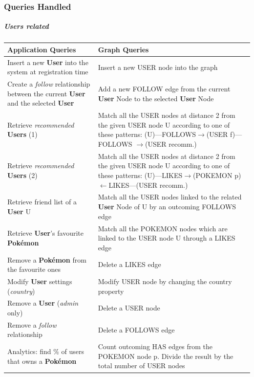 \subsubsection{Queries Handled}
\subparagraph{Users related}
\begingroup
\setlength{\tabcolsep}{10pt} %
\renewcommand{\arraystretch}{1.5} %
\begin{center}
	\begin{longtable}{|m{}| m{} |} 
		\hline
		\textbf{Application Queries} & \textbf{Graph Queries} \\ [0.5ex] 
		\hline
		Insert a new \textbf{User} into the system at registration time 		
		& Insert a new USER node into the graph\\ 
		\hline
		Create a \textit{follow} relationship between the current \textbf{User} and the selected \textbf{User}		
		& Add a new FOLLOW edge from the current \textbf{User} Node to the selected \textbf{User} Node \\ 
		\hline
		Retrieve \textit{recommended} \textbf{Users} (1)
		& Match all the USER nodes at distance 2 from the given USER node U according to one of these patterns:
		(U)—FOLLOWS$\rightarrow$(USER f)—FOLLOWS $\rightarrow$(USER recomm.)\\
		\hline
		Retrieve \textit{recommended} \textbf{Users} (2)
		& Match all the USER nodes at distance 2 from the given USER node U according to one of these patterns:
		(U)—LIKES$\rightarrow$(POKEMON p)$\leftarrow$LIKES—(USER recomm.)\\
		\hline
		Retrieve friend list of a \textbf{User} U
		& Match all the USER nodes linked to the related \textbf{User} Node of U by an outcoming FOLLOWS edge\\
		\hline	
		Retrieve \textbf{User}’s favourite \textbf{Pokémon} 
		& Match all the POKEMON nodes which are linked to the USER node U through a LIKES edge\\
		\hline	
		Remove a \textbf{Pokémon} from the favourite ones
		& Delete a LIKES edge\\
		\hline
		Modify \textbf{User} settings (\textit{country})
		& Modify USER node by changing the country property\\
		\hline	
		Remove a \textbf{User} (\textit{admin} only)
		& Delete a USER node\\
		\hline		
		Remove a \textit{follow} relationship
		& Delete a FOLLOWS edge\\
		\hline
		Analytics: find $\%$ of users that owns a \textbf{Pokémon}
		& Count outcoming HAS edges from the POKEMON node p. 
		Divide the result by the total number of USER nodes\\
		\hline
	\end{longtable}
\end{center}
